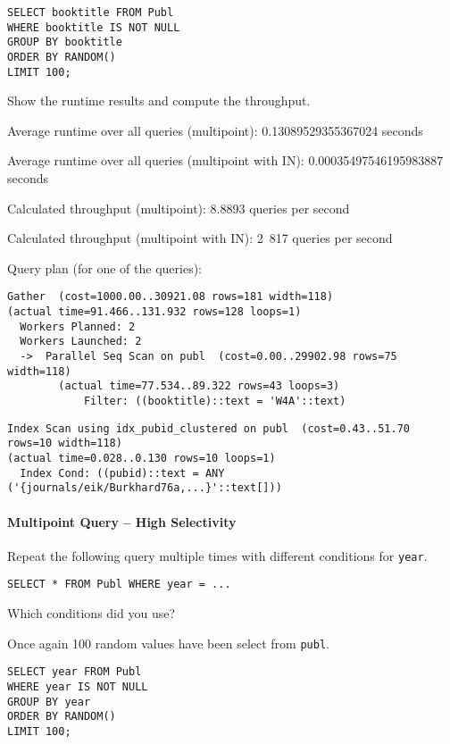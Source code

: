 \documentclass[11pt]{scrartcl}
\begin{document}
\begin{lstlisting}[style=dbtsql]
SELECT booktitle FROM Publ
WHERE booktitle IS NOT NULL 
GROUP BY booktitle
ORDER BY RANDOM() 
LIMIT 100;
\end{lstlisting}

Show the runtime results and compute the throughput.

Average runtime over all queries (multipoint): 0.13089529355367024 seconds

Average runtime over all queries (multipoint with IN): 0.00035497546195983887 seconds

Calculated throughput (multipoint): 8.8893 queries per second

Calculated throughput (multipoint with IN): 2 817 queries per second

Query plan (for one of the queries):

{\small
\parskip0pt\begin{verbatim}
Gather  (cost=1000.00..30921.08 rows=181 width=118) 
(actual time=91.466..131.932 rows=128 loops=1)
  Workers Planned: 2
  Workers Launched: 2
  ->  Parallel Seq Scan on publ  (cost=0.00..29902.98 rows=75 width=118) 
        (actual time=77.534..89.322 rows=43 loops=3)
            Filter: ((booktitle)::text = 'W4A'::text)
\end{verbatim}}

{\small
\parskip0pt\begin{verbatim}
Index Scan using idx_pubid_clustered on publ  (cost=0.43..51.70 rows=10 width=118) 
(actual time=0.028..0.130 rows=10 loops=1)
  Index Cond: ((pubid)::text = ANY ('{journals/eik/Burkhard76a,...}'::text[]))
\end{verbatim}}

\paragraph{Multipoint Query -- High Selectivity}

Repeat the following query multiple times with different conditions for \texttt{year}.

\begin{lstlisting}[style=dbtsql]
SELECT * FROM Publ WHERE year = ...
\end{lstlisting}

Which conditions did you use?

Once again 100 random values have been select from \texttt{publ}.

\begin{lstlisting}[style=dbtsql]
SELECT year FROM Publ
WHERE year IS NOT NULL 
GROUP BY year
ORDER BY RANDOM() 
LIMIT 100;
\end{lstlisting}
\end{document}
